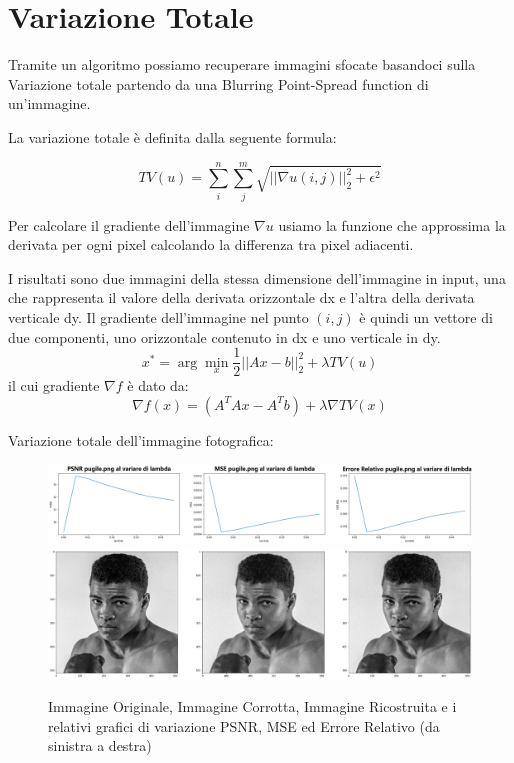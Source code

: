 \section{Variazione Totale}
Tramite un algoritmo possiamo recuperare immagini sfocate basandoci sulla Variazione totale partendo da una Blurring Point-Spread function di un'immagine. 

La variazione totale è definita dalla seguente formula:                                                                                

\[TV(u) = \sum_i^n{\sum_j^m{\sqrt{||\nabla u(i, j)||_2^2 + \epsilon^2}}}\]

Per calcolare il gradiente dell'immagine $\nabla u$ usiamo la funzione  che approssima la derivata per ogni pixel calcolando la differenza tra pixel adiacenti. 

I risultati sono due immagini della stessa dimensione dell'immagine in input, una che rappresenta il valore della derivata orizzontale dx e l'altra della derivata verticale dy. Il gradiente dell'immagine nel punto $(i, j)$ è quindi un vettore di due componenti, uno orizzontale contenuto in dx e uno verticale in dy.
\[x^* = \arg\min_x \frac{1}{2} ||Ax - b||_2^2 + \lambda TV(u)\] 
il cui gradiente $\nabla f$ è dato da: 
\[\nabla f(x) = (A^TAx - A^Tb)  + \lambda \nabla TV(x)\]

Variazione totale dell'immagine fotografica:
\begin{figure}[H]
    \centering
    \includegraphics[width=\textwidth]{imgRel/graficoPugile.png}
    \includegraphics[width=\textwidth]{imgRel/pugile.png}
    \caption{Immagine Originale, Immagine Corrotta, Immagine Ricostruita e i relativi grafici di variazione PSNR, MSE ed Errore Relativo (da sinistra a destra)}
\end{figure}

